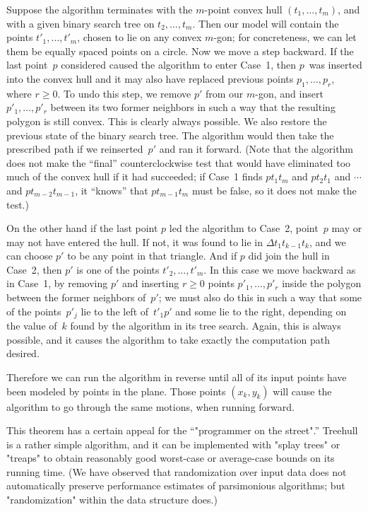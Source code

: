 Suppose the algorithm terminates with the $m$-point convex hull
$(t_1,\ldots,t_m)$, and with a given binary search tree on
$t_2,\ldots,t_m$. Then our model will contain the points
$t'_1,\ldots,t'_m$, chosen to lie on any convex $m$-gon; for
concreteness, we can let them be equally spaced points on a circle.
Now we move a step backward. If the last point~$p$ considered caused
the algorithm to enter Case~1, then $p$~was inserted into the convex hull
and it may also have replaced previous points $p_1,\ldots,p_r$, where
$r\geq 0$. To undo this step, we remove $p'$ from our $m$-gon, and
insert $p'_1,\ldots,p'_r$ between its two former neighbors in such a
way that the resulting polygon is still convex. This is clearly always
possible. We also restore the previous state of the binary search
tree. The algorithm would then take the prescribed path if we
reinserted~$p'$ and ran it forward. (Note that the algorithm does not
make the ``final'' counterclockwise test that would have eliminated
too much of the convex hull if it had succeeded; if Case~1 finds
$pt_1t_m$ and $pt_2t_1$ and $\cdots$ and $pt_{m-2}t_{m-1}$, it ``knows''
that $pt_{m-1}t_m$ must be false, so it does not make the test.)

On the other hand if the last point $p$ led the algorithm to Case~2,
point~$p$ may or may not have entered the hull. If not, it was found to lie
in $\Delta t_1t_{k-1}t_k$, and we can choose $p'$ to be any point in
that triangle. And if $p$ did join the hull in Case~2, then $p'$ is
one of the points $t'_2,\ldots,t'_m$. In this case we move backward as
in Case~1, by removing $p'$ and inserting $r\geq 0$ points
$p'_1,\ldots,p'_r$ inside the polygon between the former neighbors
of~$p'$; we must also do this in such a way that some of the
points~$p'_j$ lie to the left of~$t'_1p'$ and some lie to the right,
depending on the value of~$k$ found by the algorithm in its tree
search. Again, this is always possible, and it causes the algorithm to
take exactly the computation path desired. 

Therefore we can run the algorithm in reverse until all of its input
points have been modeled by points in the plane. Those points
$(x_k,y_k)$ will cause the algorithm to go through the same motions,
when running forward.\quad\pfbox

\bigskip
This theorem has a certain appeal for the ``"programmer on the
street".''
Treehull is a rather simple algorithm, and it can be implemented with
"splay trees" or "treaps" to obtain reasonably good worst-case or
average-case bounds on its running time. (We have observed that
randomization over input data does not automatically preserve
performance estimates of parsimonious algorithms; but "randomization"
within the data structure does.)

